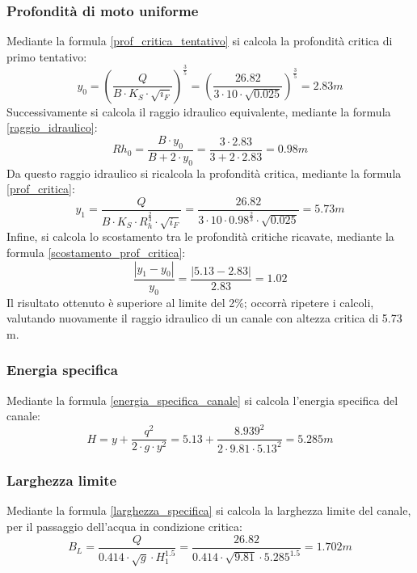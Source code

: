 \subsubsection*{Profondità di moto uniforme}
Mediante la formula \ref{prof_critica_tentativo} si calcola la profondità critica di primo tentativo:
\begin{equation}
    y_0 = \left ( \frac{Q}{B \cdot K_S \cdot \sqrt{i_F}} \right) ^ {\frac{3}{5}} = \left ( \frac{26.82}{3 \cdot 10 \cdot \sqrt{0.025}} \right) ^ {\frac{3}{5}} = 2.83m
\end{equation} 
Successivamente si calcola il raggio idraulico equivalente, mediante la formula \ref{raggio_idraulico}:
\begin{equation}
    Rh_0 = \frac{B \cdot y_0}{B + 2\cdot y_0} = \frac{3 \cdot 2.83}{3 + 2\cdot 2.83} = 0.98 m
\end{equation} 
Da questo raggio idraulico si ricalcola la profondità critica, mediante la formula \ref{prof_critica}:
\begin{equation}
    y_1 = \frac{Q}{B \cdot K_S \cdot R_h ^\frac{2}{3} \cdot \sqrt{i_F}} = \frac{26.82}{3 \cdot 10 \cdot 0.98 ^\frac{2}{3} \cdot \sqrt{0.025}} = 5.73m
\end{equation} 
Infine, si calcola lo scostamento tra le profondità critiche ricavate, mediante la formula \ref{scostamento_prof_critica}:
\begin{equation}
    \frac{|y_1 - y_0|}{y_0} = \frac{|5.13 - 2.83|}{2.83} = 1.02  
\end{equation} 
Il risultato ottenuto è superiore al limite del 2\%; occorrà ripetere i calcoli, valutando nuovamente il raggio idraulico di un canale con altezza critica di 5.73 m.

\subsubsection*{Energia specifica}
Mediante la formula \ref{energia_specifica_canale} si calcola l'energia specifica del canale:
\begin{equation}
    H = y + \frac{q^2}{2 \cdot g \cdot y^2} = 5.13 + \frac{8.939^2}{2 \cdot 9.81 \cdot 5.13^2} = 5.285m
\end{equation} 

\subsubsection*{Larghezza limite}
Mediante la formula \ref{larghezza_specifica} si calcola la larghezza limite del canale, per il passaggio dell'acqua in condizione critica:
\begin{equation}
    B_L = \frac{Q}{0.414 \cdot \sqrt{g} \cdot H_1 ^{1.5}} = \frac{26.82}{0.414 \cdot \sqrt{9.81} \cdot 5.285 ^{1.5}} = 1.702m
\end{equation}